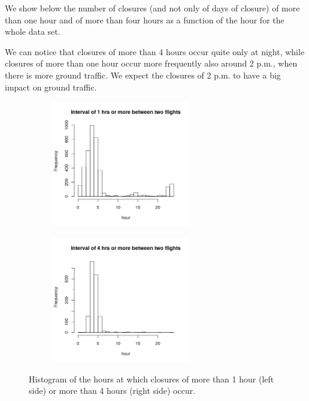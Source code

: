 \documentclass{article}
\begin{document}
We show below the number of closures (and not only of days of closure) of more than one hour and of more than four hours as a function of the hour for the whole data set.

We can notice that closures of more than 4 hours occur quite only at night, while closures of more than one hour occur more frequently also around 2 p.m., when there is more ground traffic. We expect the closures of 2 p.m. to have a big impact on ground traffic.

	\begin{figure}[h]
	\centering
		\begin{subfigure}[b]{.49\textwidth}
		\centering
		\includegraphics[width=6cm]{interval1hr.png}
		\label{1hr}
		\end{subfigure}%
		\begin{subfigure}[b]{.49\textwidth}
		\centering
		\includegraphics[width=6cm]{interval4hr.png}
		\label{4hr}
	\end{subfigure}
\caption{Histogram of the hours at which closures of more than 1 hour (left side) or more than 4 hours (right side) occur.}
	\end{figure}
\end{document}

